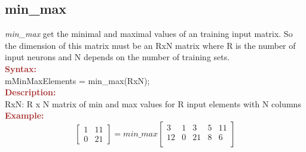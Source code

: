 \subsection{min\_max}
\textit{min\_max} get the minimal and maximal values of an training input matrix. So the dimension of this matrix must be an RxN matrix where R is the number of input neurons and N depends on the number of training sets.\\

\noindent \textbf{\textcolor{brown}{Syntax:}}\\

\noindent mMinMaxElements = min\_max(RxN);\\

\noindent \textbf{\textcolor{brown}{Description:}}\\

\noindent RxN: R x N matrix of min and max values for R input elements with N columns\\ 

\noindent \textbf{\textcolor{brown}{Example:}}\\

\begin{equation}
	\left[
		\begin{array}{cc}
     	1 &  11 \\
    	0  & 21
   \end{array} 
	 \right]            = min\_max\left[ 
	 															   \begin{array}{ccccc}
	 															   3 & 1 & 3 & 5 & 11 \\
	 															   12& 0 & 21& 8 & 6  \\
	 															   \end{array}
	 															   	 \right]
\end{equation}


